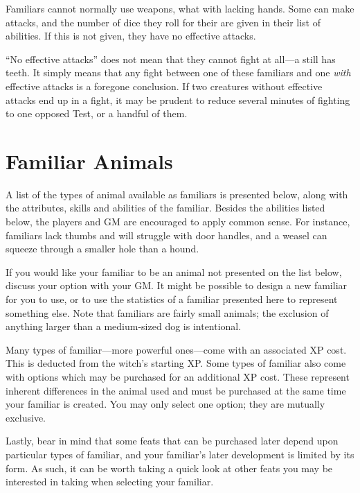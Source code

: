 Familiars cannot normally use weapons, what with lacking hands.
Some can make {\unarmed} attacks, and the number of dice they roll for their {\damagetests} are given in their list of abilities.
If this is not given, they have no effective attacks.

``No effective attacks'' does not mean that they cannot fight at all---a  still has teeth.
It simply means that any fight between one of these familiars and one \emph{with} effective attacks is a foregone conclusion.
If two creatures without effective attacks end up in a fight, it may be prudent to reduce several minutes of fighting to one opposed Test, or a handful of them.

\section{Familiar Animals}

A list of the types of animal available as familiars is presented below, along with the attributes, skills and abilities of the familiar.
Besides the abilities listed below, the players and GM are encouraged to apply common sense.
For instance, familiars lack thumbs and will struggle with door handles, and a weasel can squeeze through a smaller hole than a hound.

If you would like your familiar to be an animal not presented on the list below, discuss your option with your GM.
It might be possible to design a new familiar for you to use, or to use the statistics of a familiar presented here to represent something else.
Note that familiars are fairly small animals; the exclusion of anything larger than a medium-sized dog is intentional.

Many types of familiar---more powerful ones---come with an associated XP cost.
This is deducted from the witch's starting XP.
Some types of familiar also come with options which may be purchased for an additional XP cost.
These represent inherent differences in the animal used and must be purchased at the same time your familiar is created.
You may only select one option; they are mutually exclusive.

Lastly, bear in mind that some feats that can be purchased later depend upon particular types of familiar, and your familiar's later development is limited by its form.
As such, it can be worth taking a quick look at other feats you may be interested in taking when selecting your familiar.

